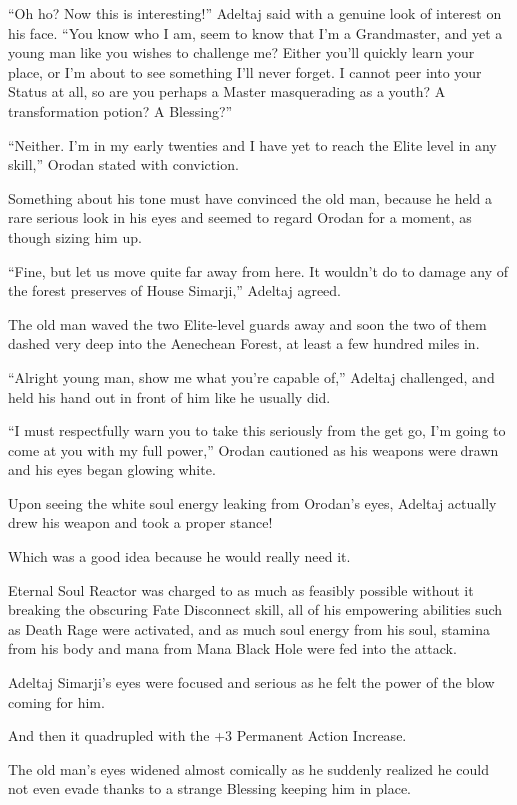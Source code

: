 \documentclass[a4paper,10pt]{book}
\begin{document}
“Oh ho? Now this is interesting!” Adeltaj said with a genuine look of interest on his face. “You know who I am, seem to know that I’m a Grandmaster, and yet a young man like you wishes to challenge me? Either you’ll quickly learn your place, or I’m about to see something I’ll never forget. I cannot peer into your Status at all, so are you perhaps a Master masquerading as a youth? A transformation potion? A Blessing?”\par
“Neither. I’m in my early twenties and I have yet to reach the Elite level in any skill,” Orodan stated with conviction.\par
Something about his tone must have convinced the old man, because he held a rare serious look in his eyes and seemed to regard Orodan for a moment, as though sizing him up.\par
“Fine, but let us move quite far away from here. It wouldn’t do to damage any of the forest preserves of House Simarji,” Adeltaj agreed.\par
The old man waved the two Elite-level guards away and soon the two of them dashed very deep into the Aenechean Forest, at least a few hundred miles in.\par
“Alright young man, show me what you’re capable of,” Adeltaj challenged, and held his hand out in front of him like he usually did.\par
“I must respectfully warn you to take this seriously from the get go, I’m going to come at you with my full power,” Orodan cautioned as his weapons were drawn and his eyes began glowing white.\par
Upon seeing the white soul energy leaking from Orodan’s eyes, Adeltaj actually drew his weapon and took a proper stance!\par
Which was a good idea because he would really need it.\par
Eternal Soul Reactor was charged to as much as feasibly possible without it breaking the obscuring Fate Disconnect skill, all of his empowering abilities such as Death Rage were activated, and as much soul energy from his soul, stamina from his body and mana from Mana Black Hole were fed into the attack.\par
Adeltaj Simarji’s eyes were focused and serious as he felt the power of the blow coming for him.\par
And then it quadrupled with the +3 Permanent Action Increase.\par
The old man’s eyes widened almost comically as he suddenly realized he could not even evade thanks to a strange Blessing keeping him in place.\par
\end{document}
